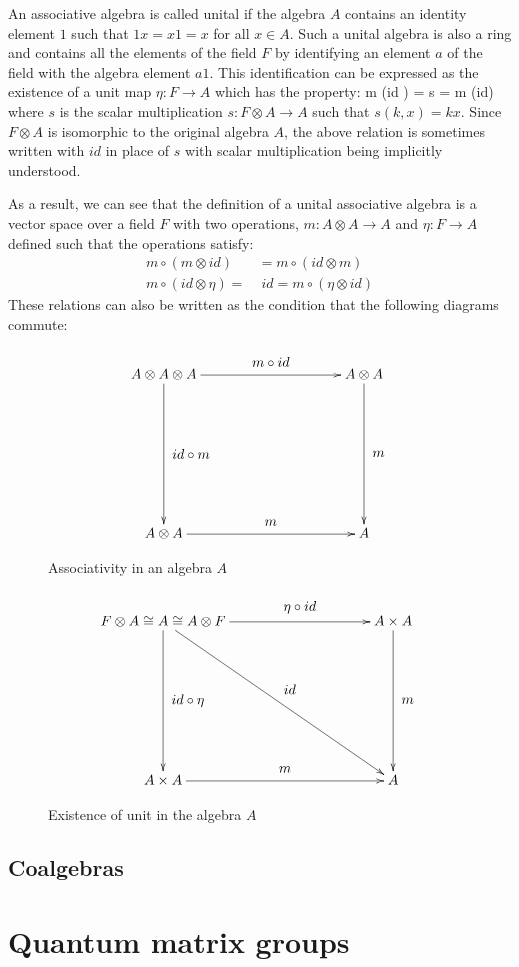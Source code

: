 An associative algebra is called unital if the algebra $A$ contains an identity element $1$ such
that $1x = x1 = x$ for all $x \in A$. Such a unital algebra is also a ring and contains all the
elements of the field $F$ by identifying an element $a$ of the field with the algebra element $a1$.
This identification can be expressed as the existence of a unit map $\eta: F \rightarrow A$ which
has the property:
\beq
m \circ (id \otimes \eta) = s = m \circ (\eta \otimes id)
\eeq
where $s$ is the scalar multiplication $s: F \otimes A \rightarrow A$ such that $s(k, x) = kx$.
Since $F \otimes A$ is isomorphic to the original algebra $A$, the above relation is sometimes
written with $id$ in place of $s$ with scalar multiplication being implicitly understood.

As a result, we can see that the definition of a unital associative algebra is a
vector space over a field $F$ with two operations, $m: A \otimes A \rightarrow A$
and $\eta: F \rightarrow A$ defined such that the operations satisfy:
\begin{align}
m\circ(m \otimes id) &= m\circ(id \otimes m) \\
m \circ (id \otimes \eta) = &\; id = m \circ (\eta \otimes id)
\end{align}
These relations can also be written as the condition that the following diagrams
commute:
\pagebreak
\begin{figure}[!h]
  \[
  \xymatrix@=100pt{
    A \otimes A \otimes A \ar[r]^-*+{m \circ id} \ar[d]^-*+{id \circ m}& A \otimes A \ar[d]^-*+{m}\\
    A \otimes A \ar[r]^-*+{m} & A \\
  }
  \]
  \caption{Associativity in an algebra $A$}
  \label{assoc-algebra}
\end{figure}
\begin{figure}[!h]
  \[
  \xymatrix@=100pt{
    F \otimes A \cong A \cong A \otimes F
       \ar[r]^-*+{\eta \circ id}
       \ar[d]^-*+{id \circ \eta}
       \ar[dr]^-*+{id} & A \times A \ar[d]^-*+{m}\\
    A \times A \ar[r]^-*+{m} & A \\
  }
  \]
  \caption{Existence of unit in the algebra $A$}
  \label{unit-algebra}
\end{figure}


\subsection{Coalgebras}

\section{Quantum matrix groups}

